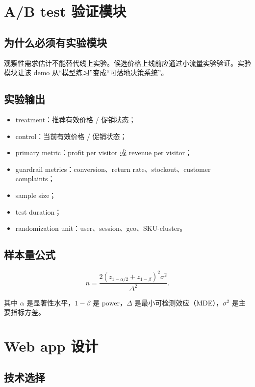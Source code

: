 \documentclass[UTF8,11pt,a4paper,fontset=none]{ctexart}
\begin{document}
\section{A/B test 验证模块}

\subsection{为什么必须有实验模块}

观察性需求估计不能替代线上实验。候选价格上线前应通过小流量实验验证。实验模块让该 demo 从“模型练习”变成“可落地决策系统”。

\subsection{实验输出}

\begin{itemize}
  \item treatment：推荐有效价格 / 促销状态；
  \item control：当前有效价格 / 促销状态；
  \item primary metric：profit per visitor 或 revenue per visitor；
  \item guardrail metrics：conversion、return rate、stockout、customer complaints；
  \item sample size；
  \item test duration；
  \item randomization unit：user、session、geo、SKU-cluster。
\end{itemize}

\subsection{样本量公式}

\begin{equation}
n = \frac{2(z_{1-\alpha/2}+z_{1-\beta})^2\sigma^2}{\Delta^2}.
\end{equation}

其中 $\alpha$ 是显著性水平，$1-\beta$ 是 power，$\Delta$ 是最小可检测效应（MDE），$\sigma^2$ 是主要指标方差。

\section{Web app 设计}

\subsection{技术选择}
\end{document}
